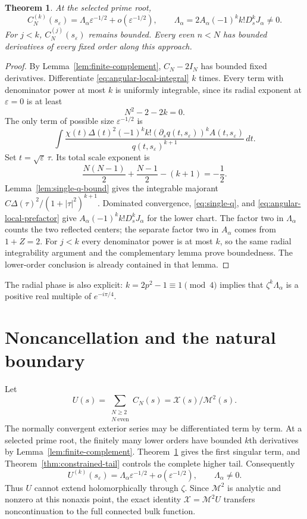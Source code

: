 \documentclass[11pt]{article}
\numberwithin{equation}{section}
\newtheorem{theorem}{Theorem}[section]
\theoremstyle{remark}\newtheorem{remark}[theorem]{Remark}
\newcommand{\X}{\mathcal X}
\newcommand{\Mtwo}{\mathcal M^2}
\begin{document}
\begin{theorem}\label{thm:single-first}
At the selected prime root,
\[
 C_N^{(k)}(s_\varepsilon)
   =\Lambda_\alpha\varepsilon^{-1/2}
          +o(\varepsilon^{-1/2}),
 \qquad
 \Lambda_\alpha=2A_\alpha(-1)^kk!D_s^kJ_\alpha\ne0.
\]
For $j<k$, $C_N^{(j)}(s_\varepsilon)$ remains bounded.
Every even $n<N$ has bounded derivatives of every fixed order
along this approach.
\end{theorem}
\begin{proof}
By Lemma~\ref{lem:finite-complement}, $C_N-2I_N$ has bounded
fixed derivatives.  Differentiate \eqref{eq:angular-local-integral}
$k$ times.  Every term with denominator power at most $k$ is
uniformly integrable, since its radial exponent at
$\varepsilon=0$ is at least
\[
 N^2-2-2k=0.
\]
The only term of possible size $\varepsilon^{-1/2}$ is
\[
 \int \frac{\chi(t)\Delta(t)^2
    (-1)^kk!(\partial_s q(t,s_\varepsilon))^k A(t,s_\varepsilon)}
       {q(t,s_\varepsilon)^{k+1}}\,dt.
\]
Set $t=\sqrt\varepsilon\,\tau$.  Its total scale exponent is
\[
 \frac{N(N-1)}2+\frac{N-1}{2}-(k+1)=-\frac12.
\]
Lemma~\ref{lem:single-q-bound} gives the integrable majorant
$C\Delta(\tau)^2/(1+|\tau|^2)^{k+1}$.
Dominated convergence, \eqref{eq:single-q}, and
\eqref{eq:angular-local-prefactor} give
$A_\alpha(-1)^kk!D_s^kJ_\alpha$ for the lower chart.
The factor two in $\Lambda_\alpha$ counts the two reflected
centers; the separate factor two in $A_\alpha$ comes from $1+Z=2$.
For $j<k$ every denominator power is at most $k$, so the same
radial integrability argument and the complementary lemma prove
boundedness.  The lower-order conclusion is already contained
in that lemma.
\end{proof}

The radial phase is also explicit: $k=2p^2-1\equiv1\pmod4$ implies that
$\zeta^k\Lambda_\alpha$ is a positive real multiple of
$e^{-i\pi/4}$.
\section{Noncancellation and the natural boundary}

Let
\[
 U(s)=\sum_{\substack{N\ge2\\N\ \mathrm{even}}}C_N(s)
             =\X(s)/\Mtwo(s).
\]
The normally convergent exterior series may be differentiated term
by term. At a selected prime root, the finitely many lower orders
have bounded $k$th derivatives by Lemma~\ref{lem:finite-complement}.
Theorem~\ref{thm:single-first} gives the first singular term, and
Theorem~\ref{thm:constrained-tail} controls the complete higher tail.
Consequently
\begin{equation}\label{eq:U-leading}
 U^{(k)}(s_\varepsilon)
       =\Lambda_\alpha\varepsilon^{-1/2}
                           +o(\varepsilon^{-1/2}),
 \qquad \Lambda_\alpha\ne0.
\end{equation}
Thus $U$ cannot extend holomorphically through $\zeta$.
Since $\Mtwo$ is analytic and nonzero at this nonaxis point,
the exact identity $\X=\Mtwo U$ transfers noncontinuation to
the full connected bulk function.
\end{document}
